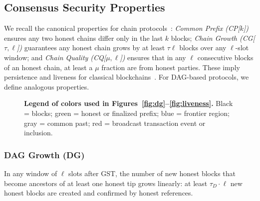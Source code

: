 \documentclass[11pt]{article}
\begin{document}
\subsection{Consensus Security Properties}

We recall the canonical properties for chain protocols~\cite{EC:GarKiaLeo15}: {\em Common Prefix (CP[$k$])} ensures any two honest chains differ only in the last $k$ blocks; {\em Chain Growth (CG[$\tau,\ell$])} guarantees any honest chain grows by at least $\tau\ell$ blocks over any $\ell$-slot window; and {\em Chain Quality (CQ[$\mu,\ell$])} ensures that in any $\ell$ consecutive blocks of an honest chain, at least a $\mu$ fraction are from honest parties. These imply persistence and liveness for classical blockchains~\cite{EC:GarKiaLeo15}.
For DAG-based protocols, we define analogous properties. 


\begin{figure}[htbp!]
\centering
{}
\caption{\textbf{Legend of colors used in Figures~\ref{fig:dg}--\ref{fig:liveness}.} 
Black = blocks; green = honest or finalized prefix; 
blue = frontier region; gray = common past; red = broadcast transaction event or inclusion.}
\label{fig:legend}
\end{figure}




\subsubsection{DAG Growth (DG)} 
In any window of $\ell$ slots after GST, the number of new honest blocks that become ancestors of at least one honest tip grows linearly: at least $\tau_D \cdot \ell$ new honest blocks are created and confirmed by honest references.
\end{document}
